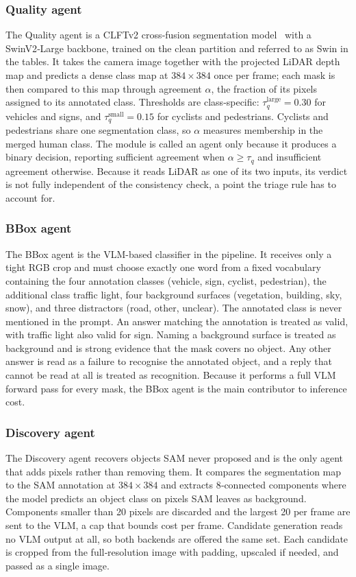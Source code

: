 \documentclass[a4paper,twoside]{article}
\begin{document}
\subsubsection{Quality agent}
The Quality agent is a CLFTv2 cross‑fusion segmentation model~\cite{gu2024clft} with a SwinV2‑Large backbone, trained on the clean partition and referred to as Swin in the tables.
It takes the camera image together with the projected LiDAR depth map and predicts a dense class map at $384 \times 384$ once per frame; each mask is then compared to this map through agreement $\alpha$, the fraction of its pixels assigned to its annotated class.
Thresholds are class‑specific: $\tau_q^{\text{large}} = 0.30$ for vehicles and signs, and $\tau_q^{\text{small}} = 0.15$ for cyclists and pedestrians.  
Cyclists and pedestrians share one segmentation class, so $\alpha$ measures membership in the merged human class.  
The module is called an agent only because it produces a binary decision, reporting sufficient agreement when $\alpha \geq \tau_q$ and insufficient agreement otherwise.
Because it reads LiDAR as one of its two inputs, its verdict is not fully independent of the consistency check, a point the triage rule has to account for.

\subsubsection{BBox agent}
The BBox agent is the VLM-based classifier in the pipeline.  
It receives only a tight RGB crop and must choose exactly one word from a fixed vocabulary containing the four annotation classes (vehicle, sign, cyclist, pedestrian), the additional class traffic light, four background surfaces (vegetation, building, sky, snow), and three distractors (road, other, unclear).  
The annotated class is never mentioned in the prompt.  
An answer matching the annotation is treated as valid, with traffic light also valid for sign.  
Naming a background surface is treated as background and is strong evidence that the mask covers no object.  
Any other answer is read as a failure to recognise the annotated object, and a reply that cannot be read at all is treated as recognition.  
Because it performs a full VLM forward pass for every mask, the BBox agent is the main contributor to inference cost.

\subsubsection{Discovery agent}
The Discovery agent recovers objects SAM never proposed and is the only agent that adds pixels rather than removing them.  
It compares the segmentation map to the SAM annotation at $384 \times 384$ and extracts 8‑connected components where the model predicts an object class on pixels SAM leaves as background.  
Components smaller than 20 pixels are discarded and the largest 20 per frame are sent to the VLM, a cap that bounds cost per frame.
Candidate generation reads no VLM output at all, so both backends are offered the same set.
Each candidate is cropped from the full‑resolution image with padding, upscaled if needed, and passed as a single image.
\end{document}

